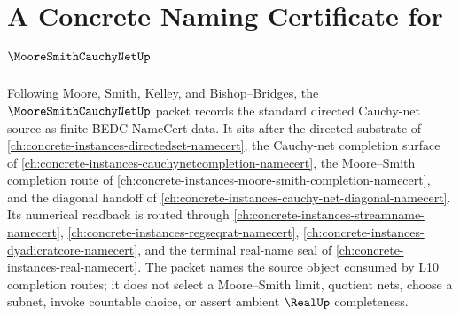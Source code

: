 \chapter{A Concrete Naming Certificate for $\MooreSmithCauchyNetUp$}
\label{ch:concrete-instances-moore-smith-cauchy-net-namecert}

Following Moore, Smith, Kelley, and Bishop--Bridges, the $\MooreSmithCauchyNetUp$ packet records the standard directed Cauchy-net source as finite BEDC NameCert data. It sits after the directed substrate of \autoref{ch:concrete-instances-directedset-namecert}, the Cauchy-net completion surface of \autoref{ch:concrete-instances-cauchynetcompletion-namecert}, the Moore--Smith completion route of \autoref{ch:concrete-instances-moore-smith-completion-namecert}, and the diagonal handoff of \autoref{ch:concrete-instances-cauchy-net-diagonal-namecert}. Its numerical readback is routed through \autoref{ch:concrete-instances-streamname-namecert}, \autoref{ch:concrete-instances-regseqrat-namecert}, \autoref{ch:concrete-instances-dyadicratcore-namecert}, and the terminal real-name seal of \autoref{ch:concrete-instances-real-namecert}. The packet names the source object consumed by L10 completion routes; it does not select a Moore--Smith limit, quotient nets, choose a subnet, invoke countable choice, or assert ambient $\RealUp$ completeness.

